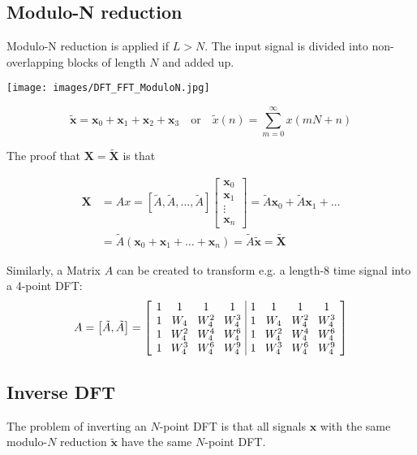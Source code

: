 \subsection{Modulo-N reduction}
Modulo-N reduction is applied if $L>N$.  The input signal is divided into
non-overlapping blocks of length $N$ and added up.

\begin{center}
	\texttt{[image: images/DFT\_FFT\_ModuloN.jpg]}
\end{center}

\begin{equation*}
	\tilde{\mathbf{x}} = \mathbf{x}_0 + \mathbf{x}_1 + \mathbf{x}_2 + \mathbf{x}_3
		\quad \text{or} \quad
	\tilde{x}(n) = \sum\limits_{m=0}^{\infty} x(mN + n)
\end{equation*}

The proof that $\mathbf{X} = \tilde{\mathbf{X}}$ is that

\begin{align*}
	\mathbf{X} &= Ax = [\tilde{A},\tilde{A},\ldots,\tilde{A}]
		\begin{bmatrix}
			\mathbf{x}_0 \\ \mathbf{x}_1 \\ \vdots \\ \mathbf{x}_n
		\end{bmatrix}
		= \tilde{A} \mathbf{x}_0 + \tilde{A} \mathbf{x}_1 + \ldots \\
	&= \tilde{A}(\mathbf{x}_0 + \mathbf{x}_1 + \ldots + \mathbf{x}_n) = \tilde{A}\tilde{\mathbf{x}} = \tilde{\mathbf{X}}
\end{align*}

Similarly, a Matrix $A$ can be created to transform e.g. a length-8 time signal
into a 4-point DFT:
\begingroup
\begin{equation*}
	\setlength\arraycolsep{4pt}
	A = \left[\tilde{A},\tilde{A}\right] = \left[ \begin{array}{cccc|cccc}
		1 & 1 & 1 & 1 & 1 & 1 & 1 & 1 \\
		1& W_4& W_4^2& W_4^3 & 1& W_4& W_4^2& W_4^3 \\
		1& W_4^2& W_4^4& W_4^6 & 1& W_4^2& W_4^4& W_4^6 \\
		1& W_4^3& W_4^6& W_4^9 & 1& W_4^3& W_4^6& W_4^9 \\
	\end{array} \right]
\end{equation*}
\endgroup

\subsection{Inverse DFT}
The problem of inverting an $N$-point DFT is that all signals $\mathbf{x}$
with the same modulo-$N$ reduction $\tilde{\mathbf{x}}$ have the same
$N$-point DFT.

